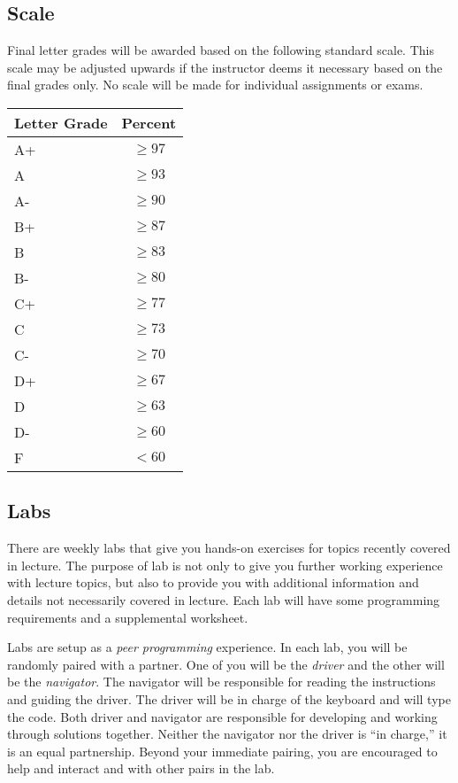 \documentclass[12pt]{scrartcl}
\begin{document}
\subsection{Scale}

Final letter grades will be awarded based on the following 
standard scale. This scale may be adjusted upwards if the 
instructor deems it necessary based on the final grades only.  
No scale will be made for individual assignments or exams.

\begin{table}[h]
\centering
\begin{tabular}{p{1cm}c}
Letter Grade & Percent \\
\hline\hline
A+ & $\geq 97$ \\
A  & $\geq 93$ \\
A- & $\geq 90$ \\
B+ & $\geq 87$ \\
B  & $\geq 83$ \\
B- & $\geq 80$ \\
C+ & $\geq 77$ \\
C  & $\geq 73$ \\
C- & $\geq 70$ \\
D+ & $\geq 67$ \\
D  & $\geq 63$ \\
D- & $\geq 60$ \\
F  & $<60$ \\
\end{tabular}
\end{table}

\subsection{Labs}

There are weekly labs that give you hands-on exercises for 
topics recently covered in lecture.  The purpose of lab is not 
only to give you further working experience with lecture topics, 
but also to provide you with additional information and details 
not necessarily covered in lecture.  Each lab will have some 
programming requirements and a supplemental worksheet.  

Labs are setup as a \emph{peer programming} experience.  In each 
lab, you will be randomly paired with a partner.  One of you will 
be the \emph{driver} and the other will be the \emph{navigator}.  
The navigator will be responsible for reading the instructions 
and guiding the driver.  The driver will be in charge of the 
keyboard and will type the code.  Both driver and navigator are 
responsible for developing and working through solutions together.
Neither the navigator nor the driver is ``in charge,'' it is an 
equal partnership.  Beyond your immediate pairing, you are 
encouraged to help and interact and with other pairs in the lab.
\end{document}
